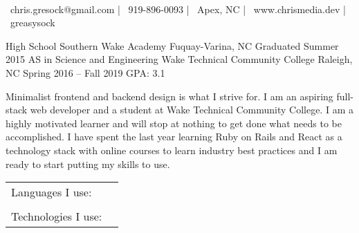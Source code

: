 \documentclass[]{awesome-cv}
\begin{document}
    
\begin{center}
	  \\
	\vspace{2mm}
	{\faEnvelope\ chris.gresock@gmail.com} | {\faMobile\ 919-896-0093} | {\faMapMarker\ Apex, NC} | {\faLink\ www.chrismedia.dev} | {\faGithub\ greasysock}
\end{center}
\begin{cventries}
	\cventry
	{High School}
	{Southern Wake Academy}
	{Fuquay-Varina, NC}
	{Graduated Summer 2015}
	{}
	\cventry
	{AS in Science and Engineering}
	{Wake Technical Community College}
	{Raleigh, NC}
	{Spring 2016 – Fall 2019}
	{GPA: 3.1}
\end{cventries}

\vspace{-2mm}

	Minimalist frontend and backend design is what I strive for. I am an aspiring full-stack web developer and a student at Wake Technical Community College. I am a highly motivated learner and will stop at nothing to get done what needs to be accomplished. I have spent the last year learning Ruby on Rails and React as a technology stack with online courses to learn industry best practices and I am ready to start putting my skills to use.

\begin{cventries}
	\cventry
	{}
	{\def\arraystretch{1.15}{\begin{tabular}{ l l }
		Languages I use:  & {\skill{ Python (95\%), Ruby (85\%), Go (55\%), Javascript (85\%)}} \\
		\\
		Technologies I use:  & {\skill{ Ruby on Rails (Ruby), React (Javascript),  Redux (Javscript), Sqlalchemy (Python), Git, Linux}} \\
		\end{tabular}}}
	{}
	{}
	{}
\end{cventries}
\end{document}
